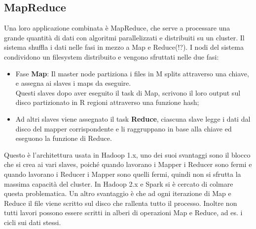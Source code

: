 \documentclass[11pt, twocolumn]{article}
\newenvironment{myitemize}
{ \begin{itemize}[topsep=0ex]
		\setlength{\itemsep}{0pt}
		\setlength{\parskip}{0pt}
		\setlength{\parsep}{0pt}     }
	{ \end{itemize}                  }
\begin{document}
\subsection{MapReduce}
Una loro applicazione combinata è MapReduce, che serve a processare una grande quantità di dati con algoritmi parallelizzati e distribuiti su un cluster. 
Il sistema shuffla i dati nelle fasi in mezzo a Map e Reduce(!?). 
I nodi del sistema condividono un filesystem distribuito e vengono sfruttati nelle due fasi:
\begin{myitemize}
	\item Fase \textbf{Map}: Il master node partiziona i files in M splits attraverso una chiave, e assegna ai slaves i maps da eseguire.\\
	Questi slaves dopo aver eseguito il task di Map, scrivono il loro output sul disco partizionato in R regioni attraverso una funzione hash;
	\item Ad altri slaves viene assegnato il task \textbf{Reduce}, ciascuna slave legge i dati dal disco del mapper corrispondente e li raggruppano in base alla chiave ed eseguono la funzione di Reduce.
\end{myitemize}
Questo è l'architettura usata in Hadoop 1.x, uno dei suoi svantaggi sono il blocco che si crea ai vari slaves, poiché quando lavorano i Mapper i Reducer sono fermi e quando lavorano i Reducer i Mapper sono quelli fermi, quindi non si sfrutta la massima capacità del cluster. In Hadoop 2.x e Spark si è cercato di colmare questa problematica. 
Un altro svantaggio è che ad ogni iterazione di Map e Reduce il file viene scritto sul disco che rallenta tutto il processo. 
Inoltre non tutti lavori possono essere scritti in alberi di operazioni Map e Reduce, ad es. i cicli sui dati stessi.\\
\end{document}
